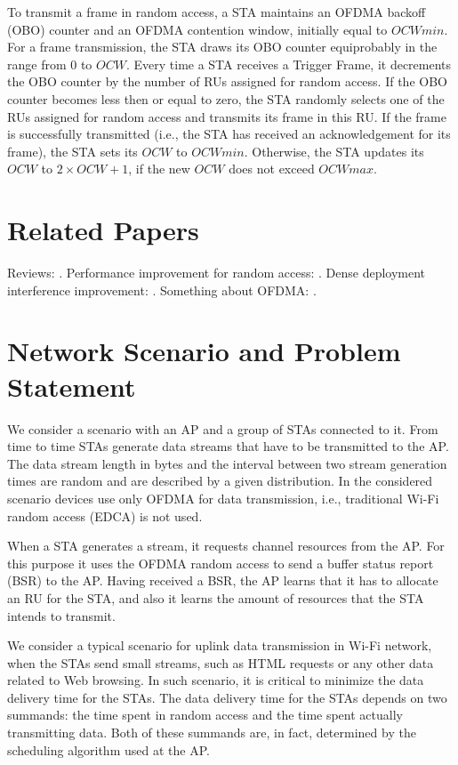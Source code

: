 To transmit a frame in random access, a STA maintains an OFDMA backoff (OBO) counter and an OFDMA contention window, initially equal to $OCWmin$.
For a frame transmission, the STA draws its OBO counter equiprobably in the range from $0$ to $OCW$.
Every time a STA receives a Trigger Frame, it decrements the OBO counter by the number of RUs assigned for random access.
If the OBO counter becomes less then or equal to zero, the STA randomly selects one of the RUs assigned for random access and transmits its frame in this RU.
If the frame is successfully transmitted (i.e., the STA has received an acknowledgement for its frame), the STA sets its $OCW$ to $OCWmin$.
Otherwise, the STA updates its $OCW$ to $2 \times OCW + 1$, if the new $OCW$ does not exceed $OCWmax$.

\section{Related Papers}
Reviews: \cite{khorov2015ieee, bellalta2016ieee}.
Performance improvement for random access: \cite{khorov2016several}.
Dense deployment interference improvement: \cite{khorov2016joint}.
Something about OFDMA: \cite{qu2015ofdma}.

\section{Network Scenario and Problem Statement}
We consider a scenario with an AP and a group of STAs connected to it.
From time to time STAs generate data streams that have to be transmitted to the AP.
The data stream length in bytes and the interval between two stream generation times are random and are described by a given distribution.
In the considered scenario devices use only OFDMA for data transmission, i.e., traditional Wi-Fi random access (EDCA) is not used.

When a STA generates a stream, it requests channel resources from the AP.
For this purpose it uses the OFDMA random access to send a buffer status report (BSR) to the AP.
Having received a BSR, the AP learns that it has to allocate an RU for the STA, and also it learns the amount of resources that the STA intends to transmit.

We consider a typical scenario for uplink data transmission in Wi-Fi network, when the STAs send small streams, such as HTML requests or any other data related to Web browsing.
In such scenario, it is critical to minimize the data delivery time for the STAs.
The data delivery time for the STAs depends on two summands: the time spent in random access and the time spent actually transmitting data.
Both of these summands are, in fact, determined by the scheduling algorithm used at the AP.

